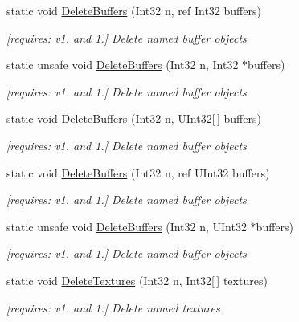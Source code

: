 \begin{DoxyCompactItemize}
static void \hyperlink{class_open_t_k_1_1_graphics_1_1_e_s11_1_1_g_l_a7e6e017974d31b3632236870fabcef24}{Delete\-Buffers} (Int32 n, ref Int32 buffers)
\begin{DoxyCompactList}\small\item\em \mbox{[}requires\-: v1. and 1.\mbox{]} Delete named buffer objects \end{DoxyCompactList}\item 
static unsafe void \hyperlink{class_open_t_k_1_1_graphics_1_1_e_s11_1_1_g_l_a35d8d449eb10b73cfffad3aa3cccece5}{Delete\-Buffers} (Int32 n, Int32 $\ast$buffers)
\begin{DoxyCompactList}\small\item\em \mbox{[}requires\-: v1. and 1.\mbox{]} Delete named buffer objects \end{DoxyCompactList}\item 
static void \hyperlink{class_open_t_k_1_1_graphics_1_1_e_s11_1_1_g_l_ad9115415050bbb67d553f302ad158eec}{Delete\-Buffers} (Int32 n, U\-Int32\mbox{[}$\,$\mbox{]} buffers)
\begin{DoxyCompactList}\small\item\em \mbox{[}requires\-: v1. and 1.\mbox{]} Delete named buffer objects \end{DoxyCompactList}\item 
static void \hyperlink{class_open_t_k_1_1_graphics_1_1_e_s11_1_1_g_l_a808d320170e777ba97333d4fda18b686}{Delete\-Buffers} (Int32 n, ref U\-Int32 buffers)
\begin{DoxyCompactList}\small\item\em \mbox{[}requires\-: v1. and 1.\mbox{]} Delete named buffer objects \end{DoxyCompactList}\item 
static unsafe void \hyperlink{class_open_t_k_1_1_graphics_1_1_e_s11_1_1_g_l_a2493b9034bce2816eb7d4ffb9c441f23}{Delete\-Buffers} (Int32 n, U\-Int32 $\ast$buffers)
\begin{DoxyCompactList}\small\item\em \mbox{[}requires\-: v1. and 1.\mbox{]} Delete named buffer objects \end{DoxyCompactList}\item 
static void \hyperlink{class_open_t_k_1_1_graphics_1_1_e_s11_1_1_g_l_a8352c6ef7c0a9392d0333a8ed4ece77f}{Delete\-Textures} (Int32 n, Int32\mbox{[}$\,$\mbox{]} textures)
\begin{DoxyCompactList}\small\item\em \mbox{[}requires\-: v1. and 1.\mbox{]} Delete named textures \end{DoxyCompactList}\item 

\end{DoxyCompactItemize}
